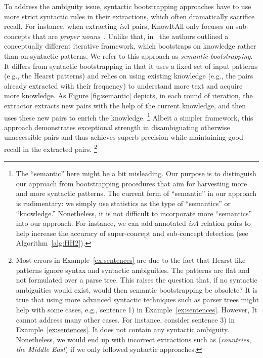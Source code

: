 \documentclass[10pt,journal,cspaper,compsoc]{IEEEtran}
\begin{document}
To address the ambiguity issue, syntactic bootstrapping approaches have to use more strict syntactic rules in their extractions,
which often dramatically sacrifice recall. For instance, when extracting \emph{isA} pairs, KnowItAll only focuses on sub-concepts
that are \emph{proper nouns}~\cite{EtzioniCDKPSSWY04}. Unlike that, in~\cite{WuLWZ12:Probase} the authors outlined a conceptually different iterative framework, which bootstraps on knowledge rather than on syntactic patterns. We refer to this approach as \emph{semantic bootstrapping}.
It differs from syntactic bootstrapping in that it uses a fixed set of input patterns (e.g., the Hearst patterns) and relies on using existing knowledge (e.g., the pairs already extracted with their frequency) to understand more text and acquire more knowledge. 
As Figure \ref{fig:semantic} depicts, in each round of iteration, the extractor extracts new pairs with
the help of the current knowledge, and then uses these new pairs to enrich
the knowledge.
\footnote{
The ``semantic'' here might be a bit misleading.
Our purpose is to distinguish our approach from bootstrapping procedures that aim for harvesting more and more syntactic patterns.
The current form of ``semantic'' in our approach is rudimentary: we simply use statistics as the type of ``semantics'' or ``knowledge.''
Nonetheless, it is not difficult to incorporate more ``semantics'' into our approach.
For instance, we can add annotated \emph{isA} relation pairs to help increase the accuracy of super-concept and sub-concept detection (see Algorithm~\ref{alg:HH2}).
} 
Albeit a simpler framework, this approach demonstrates exceptional strength in disambiguating otherwise unaccessible pairs and thus achieves superb precision while maintaining good recall in the extracted pairs.
\footnote{
Most errors in Example~\ref{ex:sentences} are due to the fact that Hearst-like patterns ignore syntax and syntactic ambiguities. The patterns are flat and not formulated over a parse tree. This raises the question that, if no syntactic ambiguities would exist, would then semantic bootstrapping be obsolete? It is true that using more advanced syntactic techniques such as parser trees might help with some cases, e.g., sentence 1) in Example~\ref{ex:sentences}. However, It cannot address many other cases. For instance, consider sentence 3) in Example~\ref{ex:sentences}.
It does not contain any syntactic ambiguity. Nonetheless, we would end up with incorrect extractions such as (\emph{countries}, \emph{the Middle East}) if we only followed syntactic approaches.
}
\end{document}
